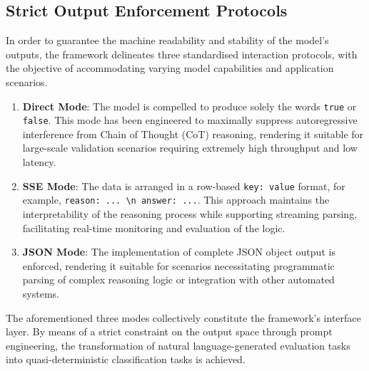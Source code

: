 \subsection{Strict Output Enforcement Protocols}

In order to guarantee the machine readability and stability of the model's outputs, the framework delineates three standardised interaction protocols, with the objective of accommodating varying model capabilities and application scenarios.

\begin{enumerate}
\item \textbf{Direct Mode}: The model is compelled to produce solely the words \texttt{true} or \texttt{false}. This mode has been engineered to maximally suppress autoregressive interference from Chain of Thought (CoT) reasoning, rendering it suitable for large-scale validation scenarios requiring extremely high throughput and low latency.
\item \textbf{SSE Mode}: The data is arranged in a row-based \texttt{key: value} format, for example, \texttt{reason: ... \textbackslash n answer: ...}. This approach maintains the interpretability of the reasoning process while supporting streaming parsing, facilitating real-time monitoring and evaluation of the logic.
\item \textbf{JSON Mode}: The implementation of complete JSON object output is enforced, rendering it suitable for scenarios necessitating programmatic parsing of complex reasoning logic or integration with other automated systems.
\end{enumerate}

The aforementioned three modes collectively constitute the framework's interface layer. By means of a strict constraint on the output space through prompt engineering, the transformation of natural language-generated evaluation tasks into quasi-deterministic classification tasks is achieved.
